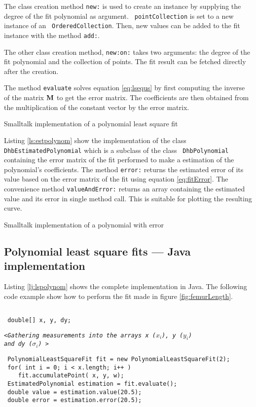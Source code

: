 \documentclass[twoside]{book}
\begin{document}
The class creation method {\tt new:} is used to create an instance
by supplying the degree of the fit polynomial as argument. {\tt
pointCollection} is set to a new instance of an {\tt
OrderedCollection}. Then, new values can be added to the fit
instance with the method {\tt add:}.

The other class creation method, {\tt new:on:} takes two
arguments: the degree of the fit polynomial and the collection of
points. The fit result can be fetched directly after the creation.

The method {\tt evaluate} solves equation \ref{eq:lsequs} by first
computing the inverse of the matrix ${\bf M}$ to get the error
matrix. The coefficients are then obtained from the multiplication
of the constant vector by the error matrix.
\begin{listing} Smalltalk implementation of a polynomial least square fit \label{ls:lspolynom}

\end{listing}

Listing \ref{ls:estpolynom} show the implementation of the class
{\tt DhbEstimatedPolynomial} which is a subclass of the class {\tt
DhbPolynomial} containing the error matrix of the fit performed to
make a estimation of the polynomial's coefficients. The method
{\tt error:} returns the estimated error of its value based on the
error matrix of the fit using equation \ref{eq:fitError}. The
convenience method {\tt valueAndError:} returns an array
containing the estimated value and its error in single method
call. This is suitable for plotting the resulting curve.

\begin{listing} Smalltalk implementation of a polynomial with error \label{ls:estpolynom}

\end{listing}

\subsection{Polynomial least square fits --- Java  implementation}
Listing \ref{lj:lspolynom} shows the complete implementation in
Java. The following code example show how to perform the fit made
in figure \ref{fig:femurLength}.
\begin{codeExample}
\begin{verbatim}

 double[] x, y, dy;
\end{verbatim}
\hfil{\tt<\sl Gathering measurements into the arrays {\tt x}
($x_i$), {\tt y} ($y_i$)\hfil \\ \hfil and {\tt dy}
($\sigma_i$)\tt
>}\hfil
\begin{verbatim}
 PolynomialLeastSquareFit fit = new PolynomialLeastSquareFit(2);
 for( int i = 0; i < x.length; i++ )
    fit.accumulatePoint( x, y, w);
 EstimatedPolynomial estimation = fit.evaluate();
 double value = estimation.value(20.5);
 double error = estimation.error(20.5);
\end{verbatim}
\end{codeExample}
\end{document}
